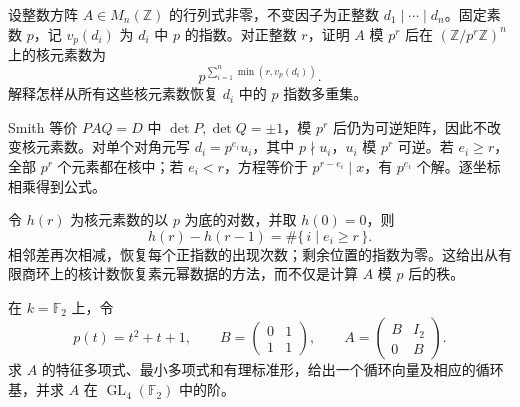 \begin{exercise}\label{b2:ex:04-modular-kernel-count}
	设整数方阵 \(A\in M_n(\mathbb Z)\) 的行列式非零，不变因子为正整数 \(d_1\mid\cdots\mid d_n\)。固定素数 \(p\)，记 \(v_p(d_i)\) 为 \(d_i\) 中 \(p\) 的指数。对正整数 \(r\)，证明 \(A\) 模 \(p^r\) 后在 \((\mathbb Z/p^r\mathbb Z)^n\) 上的核元素数为
	\[
		p^{\sum_{i=1}^n\min(r,v_p(d_i))}.
	\]
	解释怎样从所有这些核元素数恢复 \(d_i\) 中的 \(p\) 指数多重集。
\end{exercise}
\begin{solution}
	Smith 等价 \(PAQ=D\) 中 \(\det P,\det Q=\pm1\)，模 \(p^r\) 后仍为可逆矩阵，因此不改变核元素数。对单个对角元写 \(d_i=p^{e_i}u_i\)，其中 \(p\nmid u_i\)，\(u_i\) 模 \(p^r\) 可逆。若 \(e_i\ge r\)，全部 \(p^r\) 个元素都在核中；若 \(e_i<r\)，方程等价于 \(p^{r-e_i}\mid x\)，有 \(p^{e_i}\) 个解。逐坐标相乘得到公式。

	令 \(h(r)\) 为核元素数的以 \(p\) 为底的对数，并取 \(h(0)=0\)，则
	\[
		h(r)-h(r-1)=\#\{\,i\mid e_i\ge r\,\}.
	\]
	相邻差再次相减，恢复每个正指数的出现次数；剩余位置的指数为零。这给出从有限商环上的核计数恢复素元幂数据的方法，而不仅是计算 \(A\) 模 \(p\) 后的秩。
\end{solution}

\begin{exercise}
	\label{b2:ex:04-finite-field-rational-order}
	在 \(k=\mathbb F_2\) 上，令
	\[
		p(t)=t^2+t+1,\qquad
		B=\begin{pmatrix}0&1\\1&1\end{pmatrix},\qquad
		A=\begin{pmatrix}B&I_2\\0&B\end{pmatrix}.
	\]
	求 \(A\) 的特征多项式、最小多项式和有理标准形，给出一个循环向量及相应的循环基，并求 \(A\) 在 \(\operatorname{GL}_4(\mathbb F_2)\) 中的阶。
\end{exercise}

